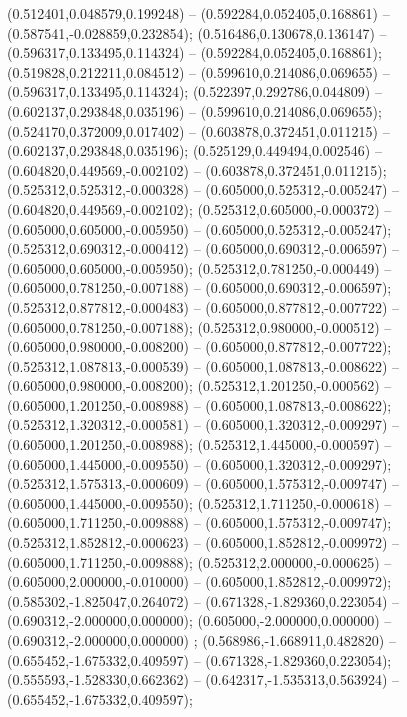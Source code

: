  (0.512401,0.048579,0.199248) -- (0.592284,0.052405,0.168861) -- (0.587541,-0.028859,0.232854);
 (0.516486,0.130678,0.136147) -- (0.596317,0.133495,0.114324) -- (0.592284,0.052405,0.168861);
 (0.519828,0.212211,0.084512) -- (0.599610,0.214086,0.069655) -- (0.596317,0.133495,0.114324);
 (0.522397,0.292786,0.044809) -- (0.602137,0.293848,0.035196) -- (0.599610,0.214086,0.069655);
 (0.524170,0.372009,0.017402) -- (0.603878,0.372451,0.011215) -- (0.602137,0.293848,0.035196);
 (0.525129,0.449494,0.002546) -- (0.604820,0.449569,-0.002102) -- (0.603878,0.372451,0.011215);
 (0.525312,0.525312,-0.000328) -- (0.605000,0.525312,-0.005247) -- (0.604820,0.449569,-0.002102);
 (0.525312,0.605000,-0.000372) -- (0.605000,0.605000,-0.005950) -- (0.605000,0.525312,-0.005247);
 (0.525312,0.690312,-0.000412) -- (0.605000,0.690312,-0.006597) -- (0.605000,0.605000,-0.005950);
 (0.525312,0.781250,-0.000449) -- (0.605000,0.781250,-0.007188) -- (0.605000,0.690312,-0.006597);
 (0.525312,0.877812,-0.000483) -- (0.605000,0.877812,-0.007722) -- (0.605000,0.781250,-0.007188);
 (0.525312,0.980000,-0.000512) -- (0.605000,0.980000,-0.008200) -- (0.605000,0.877812,-0.007722);
 (0.525312,1.087813,-0.000539) -- (0.605000,1.087813,-0.008622) -- (0.605000,0.980000,-0.008200);
 (0.525312,1.201250,-0.000562) -- (0.605000,1.201250,-0.008988) -- (0.605000,1.087813,-0.008622);
 (0.525312,1.320312,-0.000581) -- (0.605000,1.320312,-0.009297) -- (0.605000,1.201250,-0.008988);
 (0.525312,1.445000,-0.000597) -- (0.605000,1.445000,-0.009550) -- (0.605000,1.320312,-0.009297);
 (0.525312,1.575313,-0.000609) -- (0.605000,1.575312,-0.009747) -- (0.605000,1.445000,-0.009550);
 (0.525312,1.711250,-0.000618) -- (0.605000,1.711250,-0.009888) -- (0.605000,1.575312,-0.009747);
 (0.525312,1.852812,-0.000623) -- (0.605000,1.852812,-0.009972) -- (0.605000,1.711250,-0.009888);
 (0.525312,2.000000,-0.000625) -- (0.605000,2.000000,-0.010000) -- (0.605000,1.852812,-0.009972);
 (0.585302,-1.825047,0.264072) -- (0.671328,-1.829360,0.223054) -- (0.690312,-2.000000,0.000000);
 (0.605000,-2.000000,0.000000) -- (0.690312,-2.000000,0.000000) ;
 (0.568986,-1.668911,0.482820) -- (0.655452,-1.675332,0.409597) -- (0.671328,-1.829360,0.223054);
 (0.555593,-1.528330,0.662362) -- (0.642317,-1.535313,0.563924) -- (0.655452,-1.675332,0.409597);
